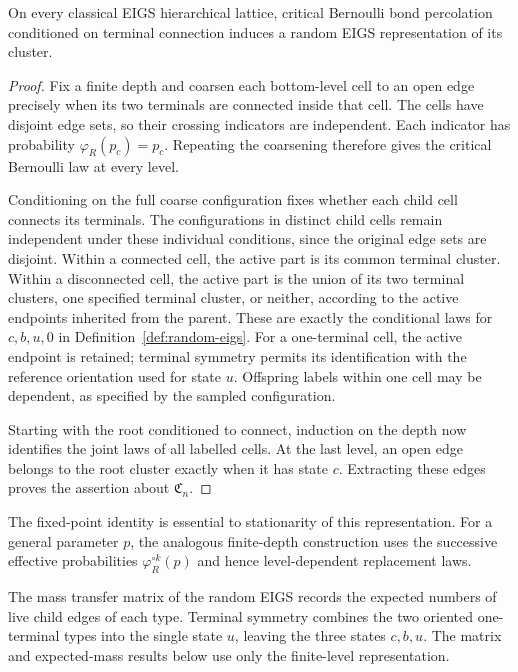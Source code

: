 \begin{theorem}\label{thm:percolation-random-eigs}
On every classical EIGS hierarchical lattice, critical Bernoulli bond percolation conditioned on terminal connection induces a random EIGS representation of its cluster.
\end{theorem}
\begin{proof}
Fix a finite depth and coarsen each bottom-level cell to an open edge precisely when its two terminals are connected inside that cell.
The cells have disjoint edge sets, so their crossing indicators are independent.
Each indicator has probability $\varphi_R(p_c)=p_c$.
Repeating the coarsening therefore gives the critical Bernoulli law at every level.

Conditioning on the full coarse configuration fixes whether each child cell connects its terminals.
The configurations in distinct child cells remain independent under these individual conditions, since the original edge sets are disjoint.
Within a connected cell, the active part is its common terminal cluster.
Within a disconnected cell, the active part is the union of its two terminal clusters, one specified terminal cluster, or neither, according to the active endpoints inherited from the parent.
These are exactly the conditional laws for $c,b,u,0$ in Definition~\ref{def:random-eigs}.
For a one-terminal cell, the active endpoint is retained; terminal symmetry permits its identification with the reference orientation used for state $u$.
Offspring labels within one cell may be dependent, as specified by the sampled configuration.

Starting with the root conditioned to connect, induction on the depth now identifies the joint laws of all labelled cells.
At the last level, an open edge belongs to the root cluster exactly when it has state $c$.
Extracting these edges proves the assertion about $\mathfrak C_n$.
\end{proof}

The fixed-point identity is essential to stationarity of this representation.
For a general parameter $p$, the analogous finite-depth construction uses the successive effective probabilities $\varphi_R^{\circ k}(p)$ and hence level-dependent replacement laws.




The mass transfer matrix of the random EIGS records the expected numbers of live child edges of each type.
Terminal symmetry combines the two oriented one-terminal types into the single state $u$, leaving the three states $c,b,u$.
The matrix and expected-mass results below use only the finite-level representation.



